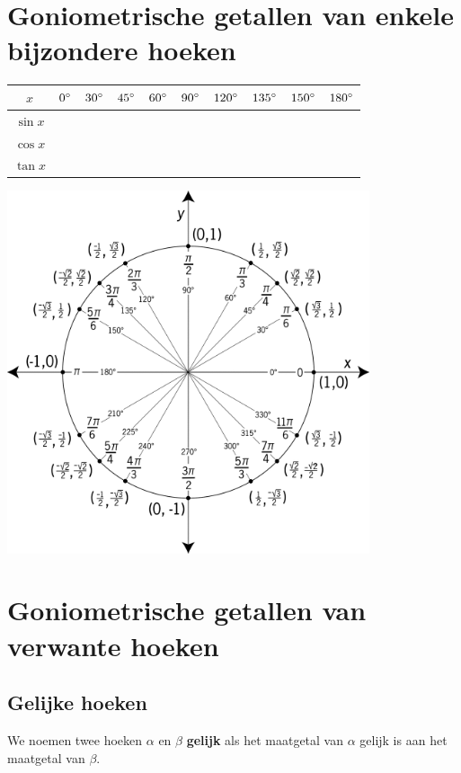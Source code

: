 \documentclass[a4paper,12pt]{article}
\begin{document}
\section{Goniometrische getallen van enkele bijzondere hoeken}
\begin{center}
  \begin{tabular}{c|c|c|c|c|c|c|c|c|c}
    $x$ & $0^\circ$ & $30^\circ$ & $45^\circ$ & $60^\circ$ & $90^\circ$ & $120^\circ$ & $135^\circ$ & $150^\circ$ & $180^\circ$ \\
    \hline
    $\sin x$&&&&&&&&&\\
    \hline
    $\cos x$&&&&&&&&&\\
    \hline
    $\tan x$&&&&&&&&&\\ 
  \end{tabular}
  \vfill
  \includegraphics[width=0.8\textwidth]{unit-circle} %
  \vfill
\end{center}


\pagebreak
\section{Goniometrische getallen van verwante hoeken}

\subsection{Gelijke hoeken}
We noemen twee hoeken $\alpha$ en $\beta$ \textbf{gelijk} als het maatgetal van $\alpha$ gelijk is aan het maatgetal van $\beta$.
\end{document}
